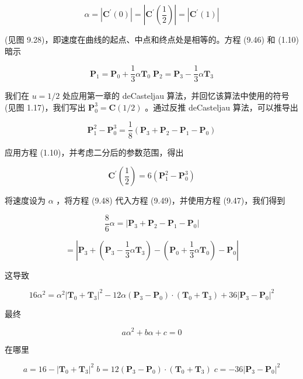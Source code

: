 \documentclass[../main.tex]{subfiles}
\begin{document}
\[
\alpha  = \left| {{\mathbf{C}}^{\prime }\left( 0\right) }\right|  = \left| {{\mathbf{C}}^{\prime }\left( \frac{1}{2}\right) }\right|  = \left| {{\mathbf{C}}^{\prime }\left( 1\right) }\right|  \tag{9.46}
\]



(见图 9.28)，即速度在曲线的起点、中点和终点处是相等的。方程 (9.46) 和 (1.10) 暗示

\[
{\mathbf{P}}_{1} = {\mathbf{P}}_{0} + \frac{1}{3}\alpha {\mathbf{T}}_{0}\;{\mathbf{P}}_{2} = {\mathbf{P}}_{3} - \frac{1}{3}\alpha {\mathbf{T}}_{3} \tag{9.47}
\]

我们在 \(u = 1/2\) 处应用第一章的 deCasteljau 算法，并回忆该算法中使用的符号(见图 1.17)，我们写出 \({\mathbf{P}}_{0}^{3} = \mathbf{C}\left( {1/2}\right)\) 。通过反推 deCasteljau 算法，可以推导出

\[
{\mathbf{P}}_{1}^{2} - {\mathbf{P}}_{0}^{3} = \frac{1}{8}\left( {{\mathbf{P}}_{3} + {\mathbf{P}}_{2} - {\mathbf{P}}_{1} - {\mathbf{P}}_{0}}\right)  \tag{9.48}
\]





应用方程 (1.10)，并考虑二分后的参数范围，得出

\[
{\mathbf{C}}^{\prime }\left( \frac{1}{2}\right)  = 6\left( {{\mathbf{P}}_{1}^{2} - {\mathbf{P}}_{0}^{3}}\right)  \tag{9.49}
\]

将速度设为 \(\alpha\) ，将方程 (9.48) 代入方程 (9.49)，并使用方程 (9.47)，我们得到

\[
\frac{8}{6}\alpha  = \left| {{\mathbf{P}}_{3} + {\mathbf{P}}_{2} - {\mathbf{P}}_{1} - {\mathbf{P}}_{0}}\right|
\]

\[
= \left| {{\mathbf{P}}_{3} + \left( {{\mathbf{P}}_{3} - \frac{1}{3}\alpha {\mathbf{T}}_{3}}\right)  - \left( {{\mathbf{P}}_{0} + \frac{1}{3}\alpha {\mathbf{T}}_{0}}\right)  - {\mathbf{P}}_{0}}\right|
\]

这导致

\[
{16}{\alpha }^{2} = {\alpha }^{2}{\left| {\mathbf{T}}_{0} + {\mathbf{T}}_{3}\right| }^{2} - {12\alpha }\left( {{\mathbf{P}}_{3} - {\mathbf{P}}_{0}}\right)  \cdot  \left( {{\mathbf{T}}_{0} + {\mathbf{T}}_{3}}\right)  + {36}{\left| {\mathbf{P}}_{3} - {\mathbf{P}}_{0}\right| }^{2}
\]

最终

\[
a{\alpha }^{2} + {b\alpha } + c = 0 \tag{9.50}
\]

在哪里

\[
a = {16} - {\left| {\mathbf{T}}_{0} + {\mathbf{T}}_{3}\right| }^{2}\;b = {12}\left( {{\mathbf{P}}_{3} - {\mathbf{P}}_{0}}\right)  \cdot  \left( {{\mathbf{T}}_{0} + {\mathbf{T}}_{3}}\right) \;c =  - {36}{\left| {\mathbf{P}}_{3} - {\mathbf{P}}_{0}\right| }^{2}
\]
\end{document}
